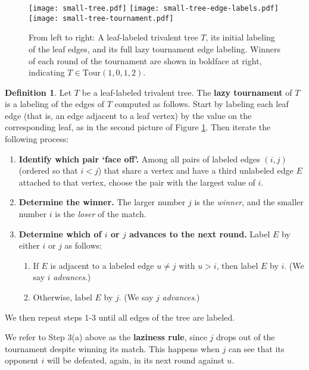 \documentclass[11pt]{amsart}
\newcommand{\Tour}{\mathrm{Tour}}
\numberwithin{thm}{section}
\numberwithin{equation}{section}
\numberwithin{figure}{section}
\theoremstyle{definition}
\newtheorem{definition}[thm]{Definition}
\begin{document}
\begin{figure}
    \centering
    \texttt{[image: small-tree.pdf]}\hspace{1.5cm} \texttt{[image: small-tree-edge-labels.pdf]}\hspace{1.5cm} \texttt{[image: small-tree-tournament.pdf]}
    \caption{From left to right: A leaf-labeled trivalent tree $T$, its initial labeling of the leaf edges, and its full lazy tournament edge labeling.  Winners of each round of the tournament are shown in boldface at right, indicating $T \in \Tour(1, 0, 1, 2)$.}
    \label{fig:example-tournament}
\end{figure}

\begin{definition}\label{def:lazy-tournament}
Let $T$ be a leaf-labeled trivalent tree. The \textbf{lazy tournament} of $T$ is a labeling of the edges of $T$ computed as follows.  Start by labeling each leaf edge (that is, an edge adjacent to a leaf vertex) by the value on the corresponding leaf, as in the second picture of Figure \ref{fig:example-tournament}.  Then iterate the following process:
\begin{enumerate}
    \item \textbf{Identify which pair `face off'.} Among all pairs of labeled edges $(i,j)$ (ordered so that $i<j$) that share a vertex and have a third unlabeled edge $E$ attached to that vertex, choose the pair with the largest value of $i$.
    \item \textbf{Determine the winner.}  The larger number $j$ is the \textit{winner}, and the smaller number $i$ is the \textit{loser} of the match.
    \item \textbf{Determine which of $i$ or $j$ advances to the next round.}  Label $E$ by either $i$ or $j$ as follows:
    \begin{enumerate}
        \item If $E$ is adjacent to a labeled edge $u\neq j$ with $u>i$, then label $E$ by $i$.  (We say $i$ \textit{advances}.)
        \item Otherwise, label $E$ by $j$. (We say $j$ \textit{advances}.)
    \end{enumerate}  
\end{enumerate}
We then repeat steps 1-3 until all edges of the tree are labeled. 
\end{definition}

We refer to Step 3(a) above as the \textbf{laziness rule}, since $j$ drops out of the tournament despite winning its match. This happens when $j$ can see that its opponent $i$ will be defeated, again, in its next round against $u$. 
\end{document}
